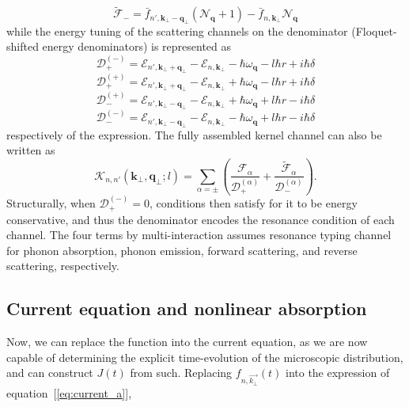 \documentclass[%
 reprint,
 amsmath,amssymb,
 aps,
]{revtex4-2}
\begin{document}
\begin{equation}
\widetilde{\mathcal{F}}_{-}
=
\bar f_{n',\mathbf{k}_{\perp}-\mathbf q_{\perp}}
(\mathcal N_{\mathbf q}+1)
-
\bar f_{n,\mathbf{k}_{\perp}}
\mathcal N_{\mathbf q}
\end{equation}
while the energy tuning of the scattering channels on the denominator (Floquet-shifted energy denominators) is represented as
\begin{equation}
\mathcal{D}_{+}^{(-)}
=
\mathcal{E}_{n',\mathbf{k}_{\perp}+\mathbf q_{\perp}}
-
\mathcal{E}_{n,\mathbf{k}_{\perp}}
-
\hbar\omega_{\mathbf q}
-
l\hbar r
+
i\hbar\delta
\end{equation}
\begin{equation}
\mathcal{D}_{+}^{(+)}
=
\mathcal{E}_{n',\mathbf{k}_{\perp}+\mathbf q_{\perp}}
-
\mathcal{E}_{n,\mathbf{k}_{\perp}}
+
\hbar\omega_{\mathbf q}
-
l\hbar r
+
i\hbar\delta
\end{equation}
\begin{equation}
\mathcal{D}_{-}^{(+)}
=
\mathcal{E}_{n',\mathbf{k}_{\perp}-\mathbf q_{\perp}}
-
\mathcal{E}_{n,\mathbf{k}_{\perp}}
+
\hbar\omega_{\mathbf q}
+
l\hbar r
-
i\hbar\delta
\end{equation}
\begin{equation}
\mathcal{D}_{-}^{(-)}
=
\mathcal{E}_{n',\mathbf{k}_{\perp}-\mathbf q_{\perp}}
-
\mathcal{E}_{n,\mathbf{k}_{\perp}}
-
\hbar\omega_{\mathbf q}
+
l\hbar r
-
i\hbar\delta
\end{equation}
respectively of the expression. The fully assembled kernel channel can also be written as
\begin{equation}
\mathcal{K}_{n,n'}(\mathbf{k}_{\perp},\mathbf{q}_{\perp};l)
=
\sum_{\alpha=\pm}
\left(
\frac{\mathcal{F}_{\alpha}}{\mathcal{D}_{+}^{(\alpha)}}
+
\frac{\widetilde{\mathcal{F}}_{\alpha}}{\mathcal{D}_{-}^{(\alpha)}}
\right).
\end{equation}
Structurally, when $\mathcal{D}_{+}^{(-)}=0$, conditions then satisfy for it to be energy conservative, and thus the denominator encodes the resonance condition of each channel. The four terms by multi-interaction assumes resonance typing channel for phonon absorption, phonon emission, forward scattering, and reverse scattering, respectively. 
\subsection{Current equation and nonlinear absorption}
Now, we can replace the function into the current equation, as we are now capable of determining the explicit time-evolution of the microscopic distribution, and can construct $J(t)$ from such. Replacing $f_{n,\vec{k_\bot}}(t)$ into the expression of equation~[\ref{eq:current_a}],
\end{document}
